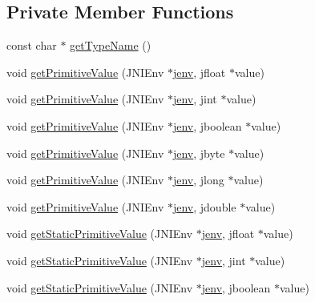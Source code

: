 \subsection*{Private Member Functions}
\begin{DoxyCompactItemize}
\item 
const char $\ast$ \hyperlink{class_kernel_arg_a88b9eef8162da192c5d0245519538417}{get\-Type\-Name} ()
\item 
void \hyperlink{class_kernel_arg_a8552d2619bff1029fb9808f97177e7b7}{get\-Primitive\-Value} (J\-N\-I\-Env $\ast$\hyperlink{aparapi_8cpp_a31595c73e9a3750524b2ff61b5a14f96}{jenv}, jfloat $\ast$value)
\item 
void \hyperlink{class_kernel_arg_a38b8d4a21460c090e0ade4cf833a4563}{get\-Primitive\-Value} (J\-N\-I\-Env $\ast$\hyperlink{aparapi_8cpp_a31595c73e9a3750524b2ff61b5a14f96}{jenv}, jint $\ast$value)
\item 
void \hyperlink{class_kernel_arg_a7fb6ada5ddd53e616a8c3a131103f9e9}{get\-Primitive\-Value} (J\-N\-I\-Env $\ast$\hyperlink{aparapi_8cpp_a31595c73e9a3750524b2ff61b5a14f96}{jenv}, jboolean $\ast$value)
\item 
void \hyperlink{class_kernel_arg_aa465cfbea45ce00205768609ed3e9d06}{get\-Primitive\-Value} (J\-N\-I\-Env $\ast$\hyperlink{aparapi_8cpp_a31595c73e9a3750524b2ff61b5a14f96}{jenv}, jbyte $\ast$value)
\item 
void \hyperlink{class_kernel_arg_a9c165792868716005957ee3c1bca7977}{get\-Primitive\-Value} (J\-N\-I\-Env $\ast$\hyperlink{aparapi_8cpp_a31595c73e9a3750524b2ff61b5a14f96}{jenv}, jlong $\ast$value)
\item 
void \hyperlink{class_kernel_arg_a2e4c14bd27f43be4c1482c4714e6c926}{get\-Primitive\-Value} (J\-N\-I\-Env $\ast$\hyperlink{aparapi_8cpp_a31595c73e9a3750524b2ff61b5a14f96}{jenv}, jdouble $\ast$value)
\item 
void \hyperlink{class_kernel_arg_ac545f1203b8ba8ab301b8e3ce60357eb}{get\-Static\-Primitive\-Value} (J\-N\-I\-Env $\ast$\hyperlink{aparapi_8cpp_a31595c73e9a3750524b2ff61b5a14f96}{jenv}, jfloat $\ast$value)
\item 
void \hyperlink{class_kernel_arg_a38128b0843f283bd4af95ba2f301e9d1}{get\-Static\-Primitive\-Value} (J\-N\-I\-Env $\ast$\hyperlink{aparapi_8cpp_a31595c73e9a3750524b2ff61b5a14f96}{jenv}, jint $\ast$value)
\item 
void \hyperlink{class_kernel_arg_a726eab9b0864237a01cea9263268cec5}{get\-Static\-Primitive\-Value} (J\-N\-I\-Env $\ast$\hyperlink{aparapi_8cpp_a31595c73e9a3750524b2ff61b5a14f96}{jenv}, jboolean $\ast$value)

\end{DoxyCompactItemize}
